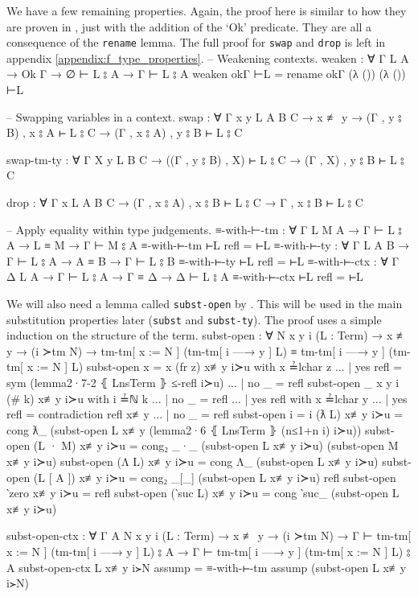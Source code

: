 \documentclass[logo,bsc,singlespacing,parskip,online]{infthesis}
\renewenvironment{code}{\mintedcopy[breaklines,breaksymbolleft=\;]{agda}}{\endmintedcopy}
\begin{document}
We have a few remaining properties. Again, the proof here is similar to how they are proven in
\citet{wadler_programming_2022}, just with the addition of the `Ok' predicate. They are all a
consequence of the \texttt{rename} lemma. The full proof for \texttt{swap} and \texttt{drop} is left
in appendix \ref{appendix:f_type_properties}.
\begin{code}
  -- Weakening contexts.
  weaken : ∀ {Γ L A} → Ok Γ → ∅ ⊢ L ⦂ A → Γ ⊢ L ⦂ A
  weaken okΓ ⊢L = rename okΓ (λ ()) (λ ()) ⊢L

  -- Swapping variables in a context.
  swap : ∀ {Γ x y L A B C}
    → x ≢ y
    → (Γ , y ⦂ B) , x ⦂ A ⊢ L ⦂ C
    → (Γ , x ⦂ A) , y ⦂ B ⊢ L ⦂ C

  swap-tm-ty : ∀ {Γ X y L B C}
    → ((Γ , y ⦂ B) , X) ⊢ L ⦂ C
    → (Γ , X) , y ⦂ B ⊢ L ⦂ C

  drop : ∀ {Γ x L A B C}
    → (Γ , x ⦂ A) , x ⦂ B ⊢ L ⦂ C
    → Γ , x ⦂ B ⊢ L ⦂ C

  -- Apply equality within type judgements.
  ≡-with-⊢-tm : ∀ {Γ L M A} → Γ ⊢ L ⦂ A → L ≡ M → Γ ⊢ M ⦂ A
  ≡-with-⊢-tm ⊢L refl = ⊢L
  ≡-with-⊢-ty : ∀ {Γ L A B} → Γ ⊢ L ⦂ A → A ≡ B → Γ ⊢ L ⦂ B
  ≡-with-⊢-ty ⊢L refl = ⊢L
  ≡-with-⊢-ctx : ∀ {Γ Δ L A} → Γ ⊢ L ⦂ A → Γ ≡ Δ → Δ ⊢ L ⦂ A
  ≡-with-⊢-ctx ⊢L refl = ⊢L
\end{code}

We will also need a lemma called \texttt{subst-open} by \citet{chargueraud_locally_2012}. This will
be used in the main substitution properties later (\texttt{subst} and \texttt{subst-ty}). The proof
uses a simple induction on the structure of the term.
\begin{code}
  subst-open : ∀ {N x y i} (L : Term)
    → x ≢ y → (i ≻tm N)
    → tm-tm[ x := N ] (tm-tm[ i —→ y ] L)
      ≡ tm-tm[ i —→ y ] (tm-tm[ x := N ] L)
  subst-open {x = x} (fr z) x≢y i≻u with x ≟lchar z
  ... | yes refl = sym (lemma2·7-2 ⦃ LnsTerm ⦄ ≤-refl i≻u)
  ... | no  _    = refl
  subst-open {_} {x} {y} {i} (# k) x≢y i≻u with i ≟ℕ k
  ... | no  _ = refl
  ... | yes refl with x ≟lchar y
  ...    | yes refl = contradiction refl x≢y
  ...    | no  _    = refl
  subst-open {i = i} (ƛ L) x≢y i≻u = cong ƛ_
    (subst-open L x≢y (lemma2·6 ⦃ LnsTerm ⦄ (n≤1+n i) i≻u))
  subst-open (L · M) x≢y i≻u = cong₂ _·_
    (subst-open L x≢y i≻u) (subst-open M x≢y i≻u)
  subst-open (Λ L) x≢y i≻u = cong Λ_ (subst-open L x≢y i≻u)
  subst-open (L [ A ]) x≢y i≻u =
    cong₂ _[_] (subst-open L x≢y i≻u) refl
  subst-open ‵zero x≢y i≻u = refl
  subst-open (‵suc L) x≢y i≻u = cong ‵suc_ (subst-open L x≢y i≻u)

  subst-open-ctx : ∀ {Γ A N x y i} (L : Term)
    → x ≢ y → (i ≻tm N)
    → Γ ⊢ tm-tm[ x := N ] (tm-tm[ i —→ y ] L) ⦂ A
    → Γ ⊢ tm-tm[ i —→ y ] (tm-tm[ x := N ] L) ⦂ A
  subst-open-ctx L x≢y i≻N assump =
    ≡-with-⊢-tm assump (subst-open L x≢y i≻N)
\end{code}
\end{document}
